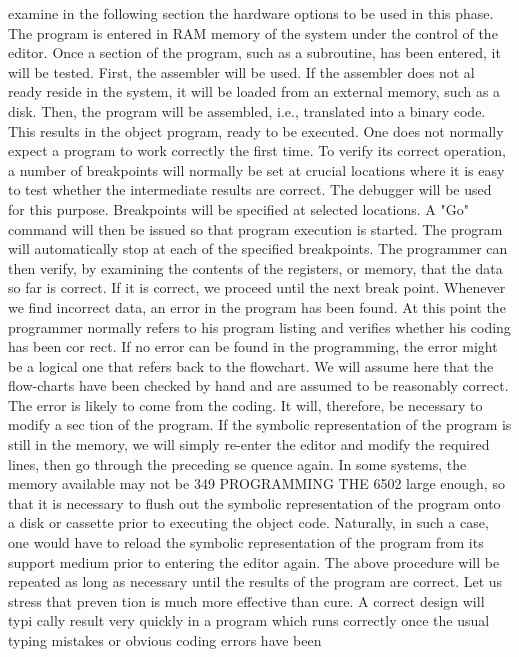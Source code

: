 {{{{{{{{{{{{{{{{{{{{{{{{{{{{{{{{{{{{{{{{{{{{{{{{{{{{{{{{{{{{{{{{{{{{{{{{{{{{{{{{{{{{{{{{{{{{{{{{{{{{{{{{{{{{{{{{{{{{{{{{{{{{{{{{{{{{{{{{{{{{examine in the following section the hardware options to be used in
this phase.
The program is entered in RAM memory of the system under
the control of the editor. Once a section of the program, such as a
subroutine, has been entered, it will be tested.
First, the assembler will be used. If the assembler does not al
ready reside in the system, it will be loaded from an external
memory, such as a disk. Then, the program will be assembled, i.e.,
translated into a binary code. This results in the object program,
ready to be executed.
One does not normally expect a program to work correctly the
first time. To verify its correct operation, a number of breakpoints
will normally be set at crucial locations where it is easy to test
whether the intermediate results are correct. The debugger will
be used for this purpose. Breakpoints will be specified at selected
locations. A "Go" command will then be issued so that program
execution is started. The program will automatically stop at each
of the specified breakpoints. The programmer can then verify, by
examining the contents of the registers, or memory, that the data
so far is correct. If it is correct, we proceed until the next break
point. Whenever we find incorrect data, an error in the program
has been found. At this point the programmer normally refers to
his program listing and verifies whether his coding has been cor
rect. If no error can be found in the programming, the error might
be a logical one that refers back to the flowchart. We will
assume here that the flow-charts have been checked by hand and
are assumed to be reasonably correct. The error is likely to come
from the coding. It will, therefore, be necessary to modify a sec
tion of the program. If the symbolic representation of the program
is still in the memory, we will simply re-enter the editor and
modify the required lines, then go through the preceding se
quence again. In some systems, the memory available may not be
349
PROGRAMMING THE 6502
large enough, so that it is necessary to flush out the symbolic
representation of the program onto a disk or cassette prior to
executing the object code. Naturally, in such a case, one would
have to reload the symbolic representation of the program from
its support medium prior to entering the editor again.
The above procedure will be repeated as long as necessary until
the results of the program are correct. Let us stress that preven
tion is much more effective than cure. A correct design will typi
cally result very quickly in a program which runs correctly once
the usual typing mistakes or obvious coding errors have been
}}}}}}}}}}}}}}}}}}}}}}}}}}}}}}}}}}}}}}}}}}}}}}}}}}}}}}}}}}}}}}}}}}}}}}}}}}}}}}}}}}}}}}}}}}}}}}}}}}}}}}}}}}}}}}}}}}}}}}}}}}}}}}}}}}}}}}}}}}}}
